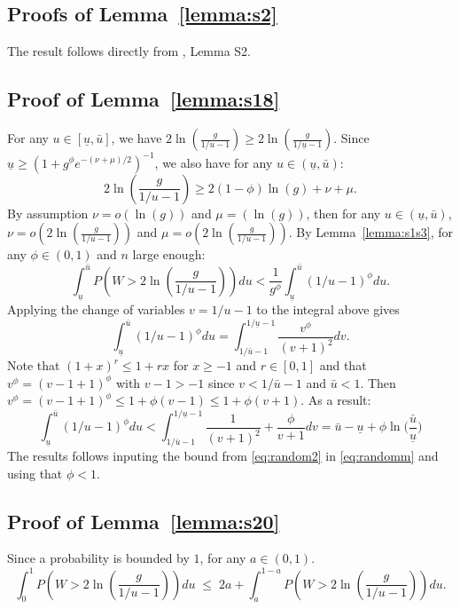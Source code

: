 \documentclass[aos]{imsart}
\theoremstyle{plain}
\begin{document}
\subsection{Proofs of Lemma~\ref{lemma:s2}}
The result follows directly from \cite{rossell2022concentration}, Lemma S2.

\subsection{Proof of Lemma~\ref{lemma:s18}}
For any $u\in [\underline{u},\bar{u}]$, we have $2\ln \left(\frac{g}{1 / u-1}\right) \geq 2\ln \left(\frac{g}{1 / \underline{u}-1}\right)$. Since $\underline{u}\geq (1+g^{\phi}e^{-(\nu+\mu)/2})^{-1}$,  we also have for any $u\in (\underline{u},\bar{u})$:
$$2\ln \left(\frac{g}{1 / u-1}\right) \geq 2(1-\phi)\ln(g)+\nu+\mu .$$
By assumption $\nu=o\left(\ln (g)\right)$ and $\mu=\left(\ln (g)\right)$, then for any $u\in (\underline{u},\bar{u})$, $\nu=o\left(2\ln \left(\frac{g}{1 / u-1}\right)\right)$ and $\mu=o\left(2\ln \left(\frac{g}{1 / u-1}\right)\right)$. By Lemma~\ref{lemma:s1s3}, for any $\phi\in(0,1)$ and $n$ large enough:
\begin{equation}\label{eq:randomm}
    \int_{\underline{u}}^{\bar{u}} P\left(W>2\ln \left(\frac{g}{1 / u-1}\right)\right) d u< \frac{1}{g^{\phi}} \int_{\underline{u}}^{\bar{u}}(1 / u-1)^{\phi} d u .
\end{equation}
Applying the change of variables $v=1 / u-1$ to the integral above gives
$$
\int_{\underline{u}}^{\bar{u}}(1 / u-1)^{\phi} d u=\int_{1 / \bar{u}-1}^{1 / \underline{u}-1} \frac{v^{\phi}}{(v+1)^2} d v.
$$
Note that $(1+x)^r \leq 1+r x$  for $x \geq-1$ and $r\in[0,1]$ and that $v^{\phi}=(v-1 + 1)^{\phi}$ with $v-1>-1$ since $v<1 / \bar{u}-1$ and $\bar{u}<1$. Then $v^{\phi}=(v-1 + 1)^{\phi}\leq 1 + \phi (v-1)\leq 1 + \phi(v+1)$. As a result:
\begin{equation}\label{eq:random2}
\int_{\underline{u}}^{\bar{u}}(1 / u-1)^{\phi} d u<\int_{1 / \bar{u}-1}^{1 / \underline{u}-1} \frac{1}{(v+1)^2} +\frac{\phi}{v+1} d v = \bar{u}-\underline{u}+\phi\ln\Big(\frac{\bar{u}}{\underline{u}}\Big)
\end{equation}
The results follows inputing the bound from \eqref{eq:random2} in \eqref{eq:randomm} and using that $\phi<1$.


\subsection{Proof of Lemma~\ref{lemma:s20}}
Since a probability is bounded by $1$, for any $a\in(0,1)$.
\begin{equation}\label{eq:basebound}
    \int_0^1 P\left(W>2 \ln \left(\frac{g}{1 / u-1}\right)\right) d u \;\leq\; 2 a+\int_{a}^{1-a} P\left(W>2\ln\left(\frac{g}{1 / u-1}\right)\right) d u.
\end{equation}
\end{document}

